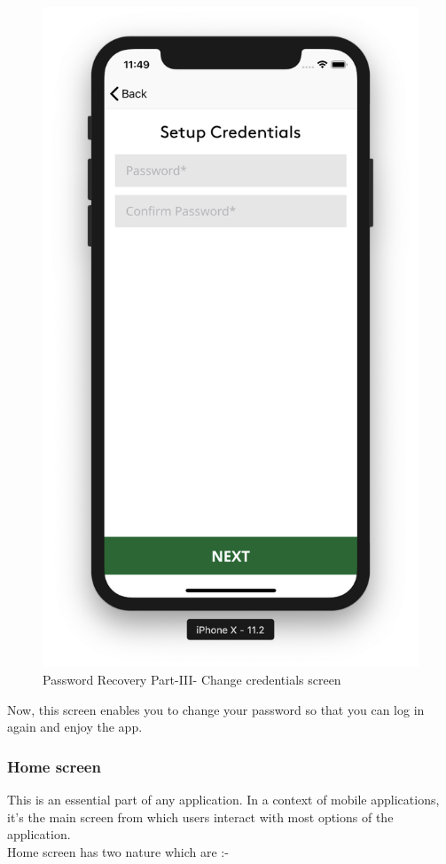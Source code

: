\begin{itemize}
\begin{itemize}
        \begin{figure}[H]
            \centering
            \includegraphics[width=0.5\linewidth]{figures/ch4/pass_recovery_3.png}
            \caption{\label{fig:pass_recovery_1} Password Recovery Part-III- Change credentials screen}
        \end{figure}
    
    Now, this screen enables you to change your password so that you can log in again and enjoy the app.
    
     \newpage
        
    \end{itemize}
    
\end{itemize}

\subsubsection{Home screen}

This is an essential part of any application. In a context of mobile applications, it's the main screen from which users interact with most options of the application. \\

Home screen has two nature which are :-

